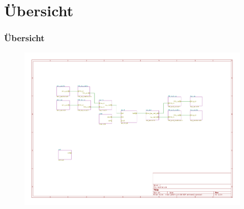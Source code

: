 \section{Übersicht}
\begin{frame}
    \frametitle{Übersicht}
    \begin{figure}
            \includegraphics[width=\textwidth]{fig/batfind.pdf}
    \end{figure}
\end{frame}
